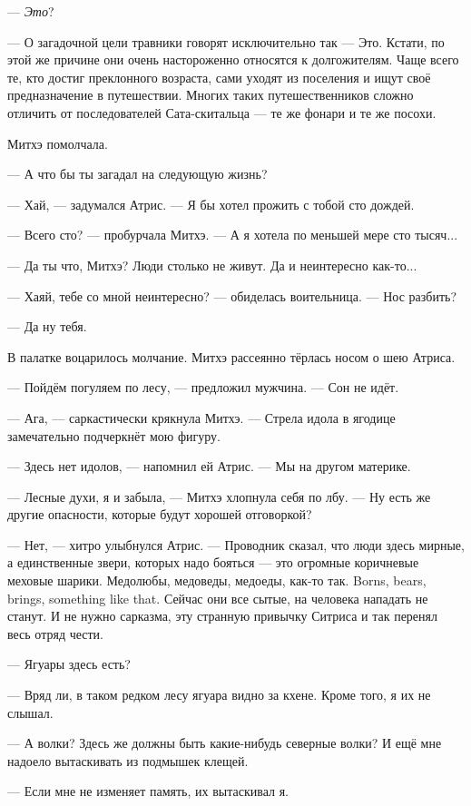 --- \emph{Это}?

--- О загадочной цели травники говорят исключительно так --- Это.
Кстати, по этой же причине они очень настороженно относятся к долгожителям.
Чаще всего те, кто достиг преклонного возраста, сами уходят из поселения и ищут своё предназначение в путешествии.
Многих таких путешественников сложно отличить от последователей Сата-скитальца --- те же фонари и те же посохи.

Митхэ помолчала.

--- А что бы ты загадал на следующую жизнь?

--- Хай, --- задумался Атрис.
--- Я бы хотел прожить с тобой сто дождей.

--- Всего сто? --- пробурчала Митхэ.
--- А я хотела по меньшей мере сто тысяч...

--- Да ты что, Митхэ?
Люди столько не живут.
Да и неинтересно как-то...

--- Хаяй, тебе со мной неинтересно? --- обиделась воительница.
--- Нос разбить?

--- Да ну тебя.

В палатке воцарилось молчание.
Митхэ рассеянно тёрлась носом о шею Атриса.

--- Пойдём погуляем по лесу, --- предложил мужчина.
--- Сон не идёт.

--- Ага, --- саркастически крякнула Митхэ.
--- Стрела идола в ягодице замечательно подчеркнёт мою фигуру.

--- Здесь нет идолов, --- напомнил ей Атрис.
--- Мы на другом материке.

--- Лесные духи, я и забыла, --- Митхэ хлопнула себя по лбу.
--- Ну есть же другие опасности, которые будут хорошей отговоркой?

--- Нет, --- хитро улыбнулся Атрис.
--- Проводник сказал, что люди здесь мирные, а единственные звери, которых надо бояться --- это огромные коричневые меховые шарики.
{Медолюбы, медоведы, медоеды, как-то так.}
{Borns, bears, brings, something like that.}
Сейчас они все сытые, на человека нападать не станут.
И не нужно сарказма, эту странную привычку Ситриса и так перенял весь отряд чести.

--- Ягуары здесь есть?

--- Вряд ли, в таком редком лесу ягуара видно за кхене.
Кроме того, я их не слышал.

--- А волки?
Здесь же должны быть какие-нибудь северные волки?
И ещё мне надоело вытаскивать из подмышек клещей.

--- Если мне не изменяет память, их вытаскивал я.

